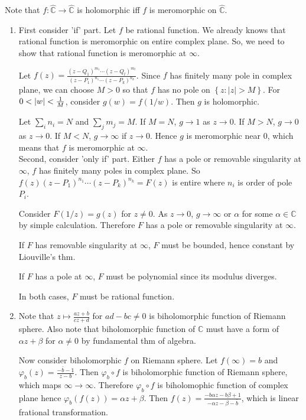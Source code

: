 \begin{problem}[4.5] \hfill

	Note that $f : \hat{\mathbb{C}} \rightarrow \hat{\mathbb{C}}$ is holomorphic iff $f$ is meromorphic on $\hat{\mathbb{C}}$.
	\begin{enumerate}[label = (\alph*)]
		\item First consider 'if' part. Let $f$ be rational function. We already knows that rational function is meromorphic on entire complex plane. So, we need to show that rational function is meromorphic at $\infty$.

			Let $f(z) = \frac{(z-Q_1)^{m_1} \cdots (z-Q_l)^{m_l}}{(z-P_1)^{n_1} \cdots (z-P_k)^{n_k}}$. Since $f$ has finitely many pole in complex plane, we can choose $M>0$ so that $f$ has no pole on $\left\{ z: |z|>M \right\}$. For $0<|w|<{1 \over M}$, consider $g(w) = f(1/w)$. Then $g$ is holomorphic.

			Let $\sum_i n_i = N$ and $\sum_j m_j = M$. If $M = N$, $g \rightarrow 1$ as $z \rightarrow 0$. If $M > N$, $g \rightarrow 0$ as $z \rightarrow 0$. If $M < N$, $g \rightarrow \infty$ if $z \rightarrow 0$. Hence $g$ is meromorphic near $0$, which means that $f$ is meromorphic at $\infty$. \\

			Second, consider 'only if' part. Either $f$ has a pole or removable singularity at $\infty$, $f$ has finitely many poles in complex plane. So $f(z)(z - P_1)^{n_1} \cdots (z-P_k)^{n_k}=F(z)$ is entire where $n_i$ is order of pole $P_i$.

			Consider $F(1/z) = g(z)$ for $z \ne 0$. As $z\rightarrow 0$, $g \rightarrow \infty$ or $\alpha$ for some $\alpha \in \mathbb{C}$ by simple calculation. Therefore $F$ has a pole or removable singularity at $\infty$.

			If $F$ has removable singularity at $\infty$, $F$ must be bounded, hence constant by Liouville's thm.

			If $F$ has a pole at $\infty$, $F$ must be polynomial since its modulus diverges.

			In both cases, $F$ must be rational function.

		\item Note that $z \mapsto \frac{az+b}{cz+d}$ for $ad -bc \ne 0$ is biholomorphic function of Riemann sphere. Also note that biholomorphic function of $\mathbb{C}$ must have a form of $\alpha z + \beta$ for $\alpha \ne 0$ by fundamental thm of algebra.

			Now consider biholomorphic $f$ on Riemann sphere. Let $f(\infty) = b$ and $\varphi_b(z) = \frac{-\bar{b} - 1}{z-b}$. Then $\varphi_b \circ f$ is biholomorphic function of Riemann sphere, which maps $\infty \rightarrow \infty$. Therefore $\varphi_b \circ f$ is biholomophic function of complex plane hence $\varphi_b (f(z)) = \alpha z + \beta$. Then $f(z) = \frac{-b\alpha z -b\beta +1}{-\alpha z -\beta -\bar{b}}$, which is linear frational transformation.
	\end{enumerate}
	
\end{problem}
